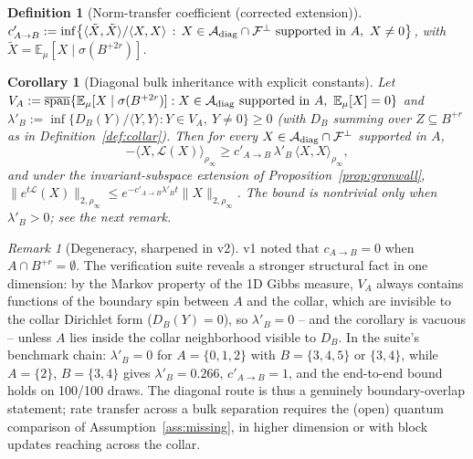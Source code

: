 \documentclass[11pt]{article}
\newtheorem{corollary}[theorem]{Corollary}
\newtheorem{definition}[theorem]{Definition}
\theoremstyle{remark}
\newtheorem{remark}[theorem]{Remark}
\begin{document}
\begin{definition}[Norm-transfer coefficient (corrected extension)]
$c'_{A\to B} := \inf\bigl\{ \langle\tilde X,\tilde X\rangle /
\langle X,X\rangle \,:\, X \in \mathcal{A}_{\rm diag}\cap\mathcal{F}^\perp
\text{ supported in } A,\ X \neq 0 \bigr\}$, with
$\tilde X = \mathbb{E}_\mu[X\mid\sigma(B^{+2r})]$.
\end{definition}

\begin{corollary}[Diagonal bulk inheritance with explicit constants]
\label{cor:diag}
Let $V_A := \overline{\rm span}\{\mathbb{E}_\mu[X\mid\sigma(B^{+2r})]
: X \in \mathcal{A}_{\rm diag} \text{ supported in } A,\
\mathbb{E}_\mu[X]=0\}$ and
$\lambda'_B := \inf\{ D_B(Y)/\langle Y,Y\rangle : Y \in V_A,\
Y \ne 0\} \ge 0$ (with $D_B$ summing over $Z \subseteq B^{+r}$ as in
Definition~\ref{def:collar}). Then for every
$X \in \mathcal{A}_{\rm diag}\cap\mathcal{F}^\perp$ supported in $A$,
\[
-\langle X, \mathcal{L}(X)\rangle_{\rho_\infty} \ge
c'_{A\to B}\, \lambda'_B\, \langle X, X\rangle_{\rho_\infty},
\]
and under the invariant-subspace extension of
Proposition~\ref{prop:gronwall}, $\|e^{t\mathcal{L}}(X)\|_{2,\rho_\infty}
\le e^{-c'_{A\to B}\lambda'_B t}\|X\|_{2,\rho_\infty}$. The bound is
nontrivial only when $\lambda'_B > 0$; see the next remark.
\end{corollary}

\begin{remark}[Degeneracy, sharpened in v2]
v1 noted that $c_{A\to B} = 0$ when $A \cap B^{+r} = \emptyset$. The
verification suite reveals a stronger structural fact in one dimension:
by the Markov property of the 1D Gibbs measure, $V_A$ always contains
functions of the boundary spin between $A$ and the collar, which are
invisible to the collar Dirichlet form ($D_B(Y) = 0$), so
$\lambda'_B = 0$ -- and the corollary is vacuous -- unless $A$ lies
inside the collar neighborhood visible to $D_B$. In the suite's
benchmark chain: $\lambda'_B = 0$ for $A = \{0,1,2\}$ with
$B = \{3,4,5\}$ or $\{3,4\}$, while $A = \{2\}$, $B = \{3,4\}$
gives $\lambda'_B = 0.266$, $c'_{A\to B} = 1$, and the end-to-end bound
holds on 100/100 draws. The diagonal route is thus a genuinely
boundary-overlap statement; rate transfer across a bulk separation
requires the (open) quantum comparison of
Assumption~\ref{ass:missing}, in higher dimension or with block updates
reaching across the collar.
\end{remark}
\end{document}
